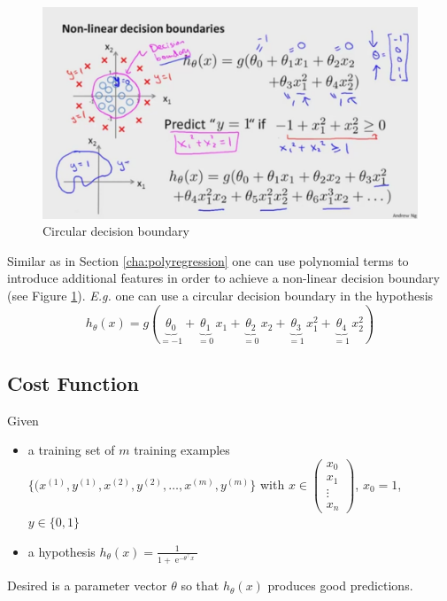 \documentclass[a4paper,twoside,10pt]{article}
\begin{document}
\begin{figure}[htbp]
  \begin{center}
    \includegraphics[width=.6\textwidth]{circularboundary}
    \caption{Circular decision boundary\citep{andrewng}\label{fig:circularboundary}}
  \end{center}
\end{figure}
Similar as in Section \ref{cha:polyregression} one can use polynomial terms to introduce additional features in order to achieve a non-linear decision boundary (see Figure \ref{fig:circularboundary}). \emph{E.g.} one can use a circular decision boundary in the hypothesis
\begin{equation*}
  h_\theta(x)=g(\underbrace{\theta_0}_{=-1}+\underbrace{\theta_1}_{=0}\,x_1+\underbrace{\theta_2}_{=0}\,x_2+\underbrace{\theta_3}_{=1}\,x_1^2+\underbrace{\theta_4}_{=1}\,x_2^2)
\end{equation*}

\subsection{Cost Function}
Given
\begin{itemize}
\item a training set of $m$ training examples $\{(x^{(1)},y^{(1)},x^{(2)},y^{(2)},\ldots,x^{(m)},y^{(m)}\}$ with
$x\in\begin{pmatrix}x_0\\x_1\\\vdots\\x_n\end{pmatrix}$, $x_0=1$, $y\in\{0,1\}$
\item a hypothesis $h_\theta(x)=\displaystyle\frac{1}{1+\operatorname{e}^{-\theta^\top x}}$
\end{itemize}
Desired is a parameter vector $\theta$ so that $h_\theta(x)$ produces good predictions.
\end{document}
